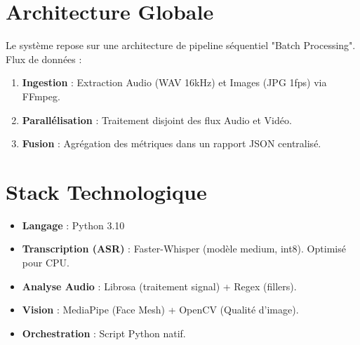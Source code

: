 \section{Architecture Globale}
Le système repose sur une architecture de pipeline séquentiel "Batch Processing".
Flux de données :
\begin{enumerate}
    \item \textbf{Ingestion} : Extraction Audio (WAV 16kHz) et Images (JPG 1fps) via FFmpeg.
    \item \textbf{Parallélisation} : Traitement disjoint des flux Audio et Vidéo.
    \item \textbf{Fusion} : Agrégation des métriques dans un rapport JSON centralisé.
\end{enumerate}

\section{Stack Technologique}
\begin{itemize}
    \item \textbf{Langage} : Python 3.10
    \item \textbf{Transcription (ASR)} : Faster-Whisper (modèle medium, int8). Optimisé pour CPU.
    \item \textbf{Analyse Audio} : Librosa (traitement signal) + Regex (fillers).
    \item \textbf{Vision} : MediaPipe (Face Mesh) + OpenCV (Qualité d'image).
    \item \textbf{Orchestration} : Script Python natif.
\end{itemize}
